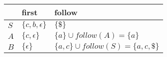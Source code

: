 \documentclass{standalone}
\providecommand\lightrule{%
	\arrayrulecolor{black!30}%
	\midrule[\lightrulewidth]%
	\arrayrulecolor{black}}
\begin{document}
\begin{tabularx}{\textwidth}{XXX}
        & first & follow \\
        \midrule
            \(S\)
            &
            \(\{c, b, \epsilon\}\)
            &
            \(\{\$\}\)
            \\ \lightrule
            \(A\)
            &
            \(\{c, \epsilon\}\)
            &
            \(\{a\} \cup follow(A) = \{a\}\)
            \\ \lightrule
            \(B\)
            &
            \(\{\epsilon\}\)
            &
            \(\{a, c\} \cup follow(S) = \{a, c, \$\}\)
    \end{tabularx}
\end{document}
